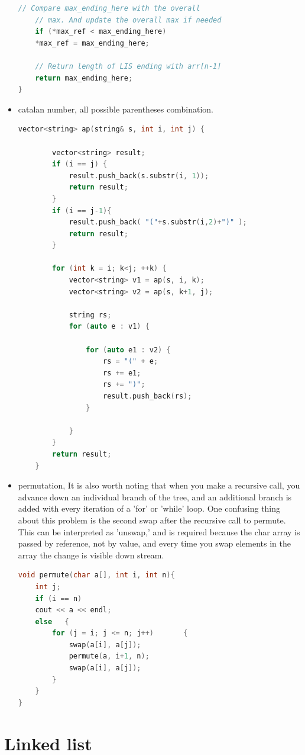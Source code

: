 \documentclass[a4paper,11pt,twoside]{book}
\begin{document}
\begin{itemize}
\begin{lstlisting}[frame=single, language=c++]
	// Compare max_ending_here with the overall
	// max. And update the overall max if needed
	if (*max_ref < max_ending_here)
	*max_ref = max_ending_here;
	
	// Return length of LIS ending with arr[n-1]
	return max_ending_here;
}
\end{lstlisting}



\item catalan number, all possible parentheses combination. 
\begin{lstlisting}[frame=single, language=c++]
	vector<string> ap(string& s, int i, int j) {
		
		vector<string> result;
		if (i == j) {
			result.push_back(s.substr(i, 1));
			return result;
		}
		if (i == j-1){
			result.push_back( "("+s.substr(i,2)+")" );
			return result;
		}
		
		for (int k = i; k<j; ++k) {
			vector<string> v1 = ap(s, i, k);
			vector<string> v2 = ap(s, k+1, j);
			
			string rs;
			for (auto e : v1) {
				
				for (auto e1 : v2) {
					rs = "(" + e;
					rs += e1;
					rs += ")";
					result.push_back(rs);
				}
				
			}
		}
		return result;
	}
\end{lstlisting}

\item permutation, It is also worth noting that when you make a recursive call, you advance down an individual branch of the tree, and an additional branch is added with every iteration of a 'for' or 'while' loop. One confusing thing about this problem is the second swap after the recursive call to permute. This can be interpreted as 'unswap,' and is required because the char array is passed by reference, not by value, and every time you swap elements in the array the change is visible down stream.

\begin{lstlisting}[frame=single, language=c++]
void permute(char a[], int i, int n){
	int j;
	if (i == n)
	cout << a << endl;
	else   {
		for (j = i; j <= n; j++)       {
			swap(a[i], a[j]);          
			permute(a, i+1, n);
			swap(a[i], a[j]);
		}
	}
} 	
\end{lstlisting}

\end{itemize}


\section{Linked list}
\end{document}
